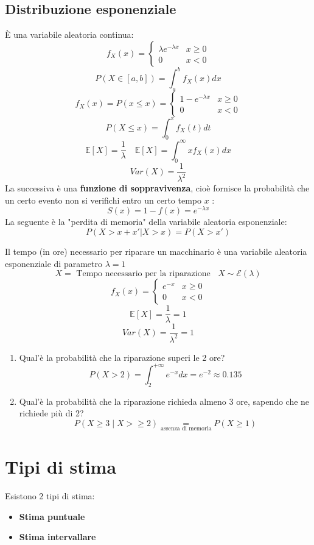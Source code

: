 \documentclass[a4paper]{article}
\theoremstyle{break}
\theoremstyle{break}
\theoremstyle{break}
\theoremstyle{break}
\begin{document}
\subsection{Distribuzione esponenziale}
È una variabile aleatoria continua:
\[
f_X(x) = \begin{cases}
  \lambda e^{-\lambda x} & x \ge 0 \\
  0 & x < 0
\end{cases}
\] 
\[
  P(X \in [a,b]) = \int_a^b f_X(x) dx
\] 
\[
f_X(x) = P(x \le x) = \begin{cases}
  1-e^{-\lambda x} & x \ge 0 \\
  0 & x < 0
\end{cases}
\] 
\[
  P(X \le x) = \int_{0}^x f_X(t) dt
\] 
\[
  \mathbb{E}[X] = \frac{1}{\lambda} \quad \mathbb{E}[X] = \int_{0}^{\infty} x f_X(x) dx
\] 
\[
  Var(X) = \frac{1}{\lambda^2}
\] 
La successiva è una \textbf{funzione di soppravivenza}, cioè fornisce la probabilità che
un certo evento non si verifichi entro un certo tempo \( x \) :
\[
  S(x) = 1-f(x) = e^{-\lambda x}
\] 
La seguente è la "perdita di memoria" della variabile aleatoria esponenziale:
\[
 P(X > x+x' | X>x) = P(X > x')
\] 

\begin{example}
  Il tempo (in ore) necessario per riparare un macchinario è una variabile aleatoria
  esponenziale di parametro \( \lambda = 1 \) 
  \[
  X = \text{ Tempo necessario per la riparazione } \;\; X \sim \mathcal{E}(\lambda)
  \] 
  \[
  f_X(x) = \begin{cases}
    e^{-x} & x \ge 0 \\
    0 & x < 0
  \end{cases}
  \] 
  \[
  \mathbb{E}[X] = \frac{1}{\lambda} = 1
  \] 
  \[
  Var(X) = \frac{1}{\lambda^2} = 1
  \] 
  \begin{enumerate}
    \item Qual'è la probabilità che la riparazione superi le 2 ore?
      \[
        P(X >2) = \int_2^{+\infty} e^{-x} dx = e^{-2} \approx 0.135
      \] 
    \item Qual'è la probabilità che la riparazione richieda almeno 3 ore, sapendo che
      ne richiede più di 2?
      \[
        P(X \ge 3 \;|\; X> \ge 2) \underset{\text{assenza di memoria}}{=} P(X \ge 1)
      \] 
  \end{enumerate}
\end{example}


\section{Tipi di stima}
Esistono 2 tipi di stima:
\begin{itemize}
  \item \textbf{Stima puntuale}
  \item \textbf{Stima intervallare}
\end{itemize}
\end{document}
